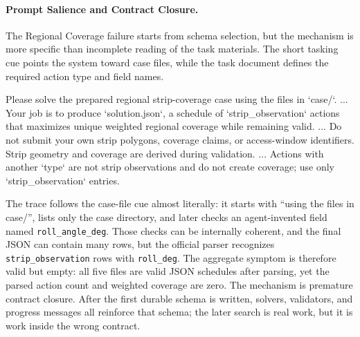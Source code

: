 \documentclass[]{mosi}
\newenvironment{promptblock}
  {\VerbatimEnvironment\par\smallskip\Needspace{10\baselineskip}\noindent\begin{promptblockinner}}
  {\end{promptblockinner}\par\smallskip}
\begin{document}
\paragraph{Prompt Salience and Contract Closure.} The Regional Coverage failure starts from schema selection, but the mechanism is more specific than incomplete reading of the task materials. The short tasking cue points the system toward case files, while the task document defines the required action type and field names.
\begin{promptblock}
Please solve the prepared regional strip-coverage case using the files in `case/`.
...
Your job is to produce `solution.json`, a schedule of `strip_observation`
actions that maximizes unique weighted regional coverage while remaining valid.
...
Do not submit your own strip polygons, coverage claims, or access-window
identifiers. Strip geometry and coverage are derived during validation.
...
Actions with another `type` are not strip observations and do not create
coverage; use only `strip_observation` entries.
\end{promptblock}
The trace follows the case-file cue almost literally: it starts with ``using the files in case/'', lists only the case directory, and later checks an agent-invented field named \texttt{roll\_angle\_deg}. Those checks can be internally coherent, and the final JSON can contain many rows, but the official parser recognizes \texttt{strip\_observation} rows with \texttt{roll\_deg}. The aggregate symptom is therefore valid but empty: all five files are valid JSON schedules after parsing, yet the parsed action count and weighted coverage are zero. The mechanism is premature contract closure. After the first durable schema is written, solvers, validators, and progress messages all reinforce that schema; the later search is real work, but it is work inside the wrong contract.
\end{document}
